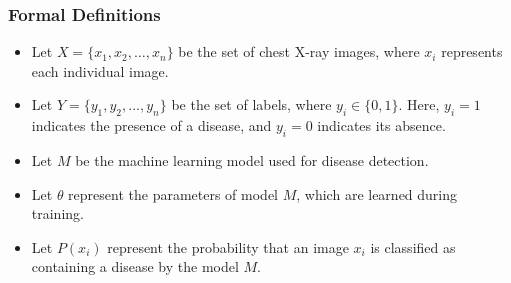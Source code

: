 \documentclass[12pt]{article}
\begin{document}
\subsubsection{Formal Definitions}
\begin{itemize}
  \item Let \( X = \{x_1, x_2, \ldots, x_n\} \) be the set of chest X-ray images, where \( x_i \) represents each individual image.
  \item Let \( Y = \{y_1, y_2, \ldots, y_n\} \) be the set of labels, where \( y_i \in \{0, 1\} \). Here, \( y_i = 1 \) indicates the presence of a disease, and \( y_i = 0 \) indicates its absence.
  \item Let \( M \) be the machine learning model used for disease detection.
  \item Let \( \theta \) represent the parameters of model \( M \), which are learned during training.
  \item Let \( P(x_i) \) represent the probability that an image \( x_i \) is classified as containing a disease by the model \( M \).
\end{itemize}
\end{document}
